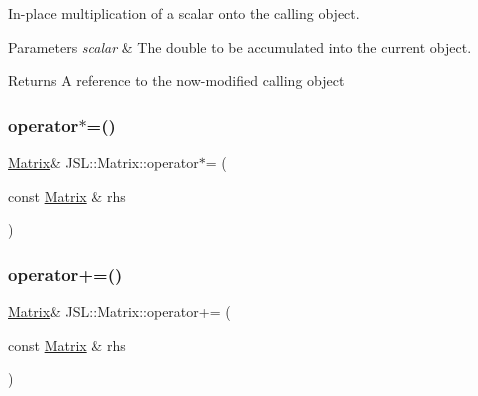 In-\/place multiplication of a scalar onto the calling object. 


\begin{DoxyParams}{Parameters}
{\em scalar} & The double to be accumulated into the current object. \\
\hline
\end{DoxyParams}
\begin{DoxyReturn}{Returns}
A reference to the now-\/modified calling object 
\end{DoxyReturn}
\mbox{\label{classJSL_1_1Matrix_a2a9cdd54f835135496bf3e87aea4dfc9}} 
\subsubsection{\texorpdfstring{operator$\ast$=()}{operator*=()}\hspace{0.1cm}{\footnotesize\ttfamily [2/2]}}
{\footnotesize\ttfamily \hyperlink{classJSL_1_1Matrix}{Matrix}\& J\+S\+L\+::\+Matrix\+::operator$\ast$= (\begin{DoxyParamCaption}\item[{const \hyperlink{classJSL_1_1Matrix}{Matrix} \&}]{rhs }\end{DoxyParamCaption})\hspace{0.3cm}{\ttfamily [inline]}}

\mbox{\label{classJSL_1_1Matrix_ae317e4316d0d40ce919fb22a9f4824a7}} 
\subsubsection{\texorpdfstring{operator+=()}{operator+=()}\hspace{0.1cm}{\footnotesize\ttfamily [1/2]}}
{\footnotesize\ttfamily \hyperlink{classJSL_1_1Matrix}{Matrix}\& J\+S\+L\+::\+Matrix\+::operator+= (\begin{DoxyParamCaption}\item[{const \hyperlink{classJSL_1_1Matrix}{Matrix} \&}]{rhs }\end{DoxyParamCaption})\hspace{0.3cm}{\ttfamily [inline]}}




